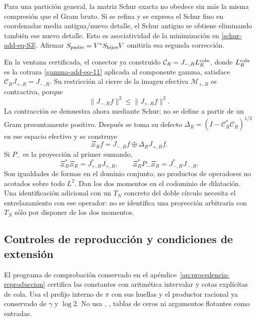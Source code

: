 Para una partición general, la matriz Schur exacta no obedece sin más
la misma compresión que el Gram bruto. Si se refina y se expresa el
Schur fino en coordenadas media antigua/nuevo detalle, el Schur
antiguo se obtiene eliminando también ese nuevo detalle. Esto es
asociatividad de la minimización en \eqref{schur-add-eq-S3}. Afirmar
\(S_{\rm padre}=V^*S_{\rm hijos}V\) omitiría esa segunda corrección.

En la ventana certificada, el conector ya construido
\(\mathcal C_R=J_{-,R}L_R^{\rm cola}\), donde
\(L_R^{\rm cola}\) es la cotraza
\eqref{gamma-add-eq-11} aplicada al componente gamma, satisface
\(\mathcal C_RJ_{+,R}=J_{-,R}\). Su restricción al cierre de la
imagen efectiva \(\mathcal M_{+,R}\) es contractiva, porque
\begin{equation}
\|J_{-,R}f\|^2\leq\|J_{+,R}f\|^2.
\label{schur-add-display-31}
\end{equation}
La contracción se demuestra ahora mediante Schur; no se define a
partir de un Gram presuntamente positivo. Después se toma su defecto
\(\Delta_R=(I-\mathcal C_R^*\mathcal C_R)^{1/2}\) en ese espacio
efectivo y se construye
\begin{equation}
\Xi_Rf=J_{-,R}f\oplus\Delta_RJ_{+,R}f.
\label{schur-add-display-32}
\end{equation}
Si \(P_-\) es la proyección al primer sumando,
\begin{equation}
\Xi_R^*\Xi_R=J_{+,R}^*J_{+,R},\qquad
\Xi_R^*P_-\Xi_R=J_{-,R}^*J_{-,R}.
\label{schur-add-display-33}
\end{equation}
Son igualdades de formas en el dominio conjunto, no productos de
operadores no acotados sobre todo \(L^2\). Dan los dos momentos en
el codominio de dilatación. Una identificación adicional con un
\(T_N\) concreto del doble círculo necesita el entrelazamiento
con ese operador: no se identifica una proyección arbitraria con
\(T_N\) sólo por disponer de los dos momentos.

\subsection{Controles de reproducción y condiciones de extensión}
\label{schur-add-sub-411}

El programa de comprobación conservado en el
apéndice~\ref{ap:procedencia-reproduccion} certifica las constantes con aritmética intervalar y cotas explícitas
de cola. Usa el prefijo interno de \(\pi\) con sus huellas y el productor
racional ya conservado de \(\gamma\) y \(\log2\). No usa \texttt{},
\texttt{}, tablas de ceros ni argumentos flotantes como entradas.

